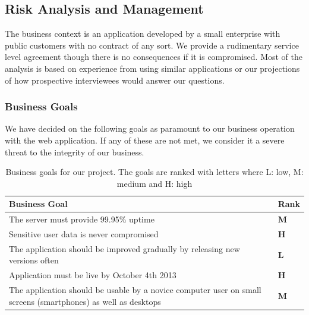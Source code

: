 \documentclass[a4paper]{article}
\begin{document}
\subsection{Risk Analysis and Management}
The business context is an application developed by a small enterprise with public customers with no contract of any sort. We provide a rudimentary service level agreement though there is no consequences if it is compromised. Most of the analysis is based on experience from using similar applications or our projections of how prospective interviewees would answer our questions.
\subsubsection{Business Goals}
We have decided on the following goals as paramount to our business operation with the web application. If any of these are not met, we consider it a severe threat to the integrity of our business.

\begin{table}[h!]
	\begin{tabular}{|p{10cm}|l|}
		\hline
		\textbf{Business Goal} & \textbf{Rank} \\ \hline
		The server must provide 99.95\% uptime   & \textbf{M} \\ \hline
		Sensitive user data is never compromised & \textbf{H} \\ \hline
		The application should be improved gradually by releasing new versions often & \textbf{L} \\ \hline
		Application must be live by October 4th 2013 &	\textbf{H}\\ \hline
		The application should be usable by a novice computer user on small screens (smartphones) as well as desktops & \textbf{M}\\ \hline
	\end{tabular}
	\caption{Business goals for our project. The goals are ranked with letters where L: low, M: medium and H: high}
	\label{tab:business_goals}
\end{table}
\end{document}
